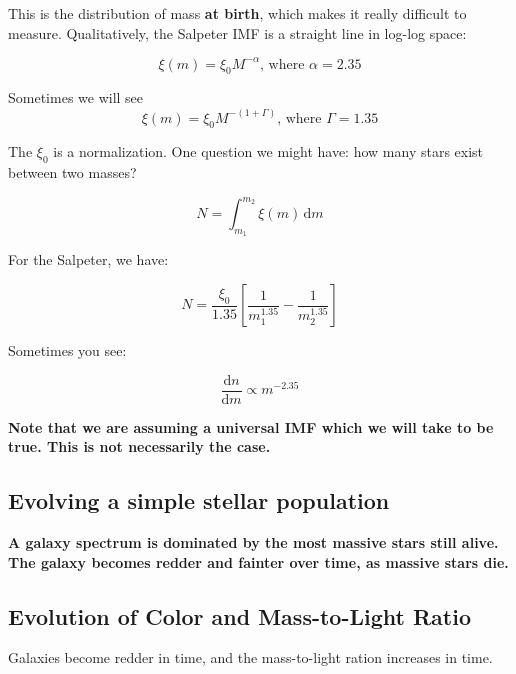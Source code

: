 \documentclass{article}
\begin{document}
This is the distribution of mass \textbf{at birth}, which makes it really difficult to measure. Qualitatively, the Salpeter IMF is a straight line in log-log space:

\begin{equation}
    \xi(m) = \xi_0 M^{-\alpha} \text{, where }\alpha = 2.35
\end{equation}

Sometimes we will see
\begin{equation}
    \xi(m) = \xi_0 M^{-(1+\Gamma)} \text{, where }\Gamma = 1.35
\end{equation}

The $\xi_0$ is a normalization. One question we might have: how many stars exist between two masses?

\begin{equation}
    N = \int_{m_1}^{m_2} \xi(m) \, \mathrm{d} m
\end{equation}

For the Salpeter, we have:

\begin{equation}
    N = \frac{\xi_0}{1.35} \left[\frac{1}{m_1^{1.35}} - \frac{1}{m_2^{1.35}}\right]
\end{equation}

Sometimes you see:

\begin{equation}
    \frac{\mathrm{d}n}{\mathrm{d}m} \propto m^{-2.35}
\end{equation}

\textbf{Note that we are assuming a universal IMF which we will take to be true. This is not necessarily the case.}

\subsection{Evolving a simple stellar population}

\textbf{A galaxy spectrum is dominated by the most massive stars still alive. The galaxy becomes redder and fainter over time, as massive stars die.}

\subsection{Evolution of Color and Mass-to-Light Ratio}

Galaxies become redder in time, and the mass-to-light ration increases in time.
\end{document}
